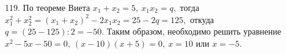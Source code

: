 119. По теореме Виета $x_1+x_2=5,\ x_1x_2=q,$ тогда $x_1^2+x_2^2=(x_1+x_2)^2-2x_1x_2=25-2q=125,$ откуда $q=(25-125):2=-50.$ Таким образом, необходимо решить уравнение $x^2-5x-50=0,\ (x-10)(x+5)=0,\ x=10$ или $x=-5.$\\
